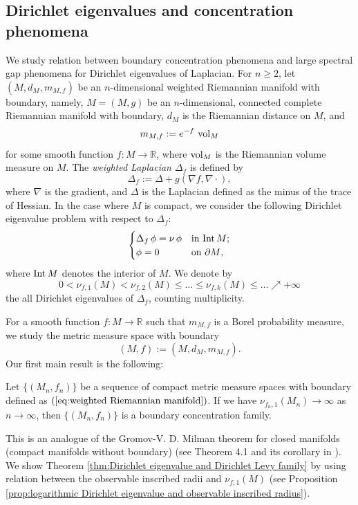 \subsection{Dirichlet eigenvalues and concentration phenomena}
We study relation between boundary concentration phenomena and large spectral gap phenomena for Dirichlet eigenvalues of Laplacian.
For $n\geq 2$,
let $(M,d_{M},m_{M,f})$ be an $n$-dimensional weighted Riemannian manifold with boundary,
namely,
$M=(M,g)$ be an $n$-dimensional,
connected complete Riemannian manifold with boundary,
$d_{M}$ is the Riemannian distance on $M$,
and
\begin{equation}\label{eq:weighted volume measure}
m_{M,f}:=e^{-f} \,\operatorname{vol}_{M}
\end{equation}
for some smooth function $f:M\to \mathbb{R}$,
where $\operatorname{vol}_{M}$ is the Riemannian volume measure on $M$.
The \textit{weighted Laplacian $\Delta_{f}$} is defined by
\begin{equation}\label{eq:weighted Laplacian}
\Delta_{f}:=\Delta+g(\nabla f,\nabla \cdot),
\end{equation}
where $\nabla$ is the gradient,
and $\Delta$ is the Laplacian defined as the minus of the trace of Hessian.
In the case where $M$ is compact,
we consider the following Dirichlet eigenvalue problem with respect to $\Delta_{f}$:
\begin{equation*}
\begin{cases}
  \Delta_{f}\, \phi=\nu\, \phi & \text{in $\mathrm{Int}\, M$};\\
  \phi=0                        & \text{on $\partial M$},
\end{cases}
\end{equation*}
where $\mathrm{Int}\, M$ denotes the interior of $M$.
We denote by
\begin{equation}\label{eq:notation of Dirichlet eigenvalue}
0< \nu_{f,1}(M) < \nu_{f,2}(M) \leq \dots \leq \nu_{f,k}(M)\leq \dots \nearrow +\infty
\end{equation}
the all Dirichlet eigenvalues of $\Delta_{f}$,
counting multiplicity.

For a smooth function $f:M\to \mathbb{R}$ such that $m_{M,f}$ is a Borel probability measure,
we study the metric measure space with boundary
\begin{equation}\label{eq:weighted Riemannian manifold}
(M,f):=(M,d_{M},m_{M,f}).
\end{equation}
Our first main result is the following:
\begin{thm}\label{thm:Dirichlet eigenvalue and Dirichlet Levy family}
Let $\{(M_{n},f_{n})\}$ be a sequence of compact metric measure spaces with boundary defined as $(\ref{eq:weighted Riemannian manifold})$.
If we have $\nu_{f_{n},1}(M_{n})\to \infty$ as $n\to \infty$,
then $\{(M_{n},f_{n})\}$ is a boundary concentration family.
\end{thm}
This is an analogue of the Gromov-V. D. Milman theorem for closed manifolds (compact manifolds without boundary) (see Theorem 4.1 and its corollary in \cite{GM}).
We show Theorem \ref{thm:Dirichlet eigenvalue and Dirichlet Levy family} by using relation between the observable inscribed radii and $\nu_{f,1}(M)$ (see Proposition \ref{prop:logarithmic Dirichlet eigenvalue and observable inscribed radius}).

